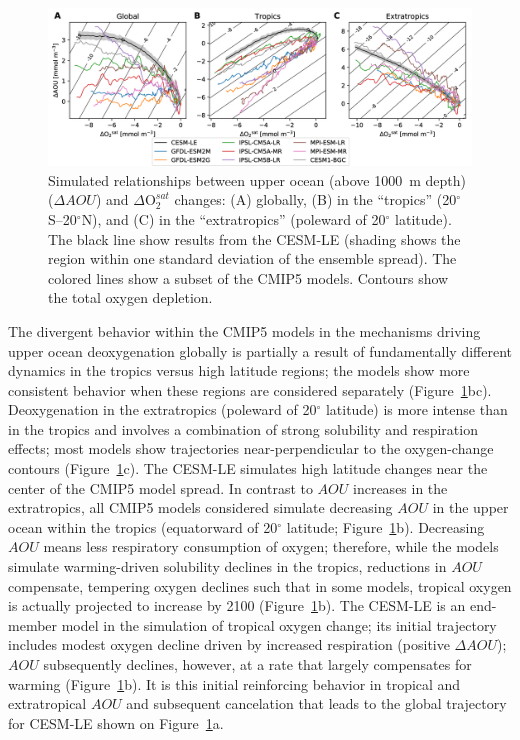 \documentclass{report_chapter}
\begin{document}
\begin{figure}[tbp]
\centering
\includegraphics[width=1\textwidth]{aou-o2sat-phase-diag.png}
\caption{Simulated relationships between upper ocean (above 1000~m depth) ($\Delta AOU$) and $\Delta\mathrm{O}_2^{sat}$ changes: (A) globally, (B) in the ``tropics'' (20$^\circ$S--20$^\circ$N), and (C) in the ``extratropics'' (poleward of 20$^\circ$ latitude).
The black line show results from the CESM-LE (shading shows the region within one standard deviation of the ensemble spread).
The colored lines show a subset of the CMIP5 models.
Contours show the total oxygen depletion.
}
\label{fig:aou-o2sat-phase}
\end{figure}

The divergent behavior within the CMIP5 models in the mechanisms driving upper ocean deoxygenation globally is partially a result of fundamentally different dynamics in the tropics versus high latitude regions; the models show more consistent behavior when these regions are considered separately (Figure~\ref{fig:aou-o2sat-phase}bc).
Deoxygenation in the extratropics (poleward of 20$^\circ$ latitude) is more intense than in the tropics and involves a combination of strong solubility and respiration effects; most models show trajectories near-perpendicular to the oxygen-change contours (Figure~\ref{fig:aou-o2sat-phase}c).
The CESM-LE simulates high latitude changes near the center of the CMIP5 model spread.
In contrast to $AOU$ increases in the extratropics, all CMIP5 models considered simulate decreasing $AOU$ in the upper ocean within the tropics (equatorward of 20$^\circ$ latitude; Figure~\ref{fig:aou-o2sat-phase}b).
Decreasing $AOU$ means less respiratory consumption of oxygen; therefore, while the models simulate warming-driven solubility declines in the tropics, reductions in $AOU$ compensate, tempering oxygen declines such that in some models, tropical oxygen is actually projected to increase by 2100 (Figure~\ref{fig:aou-o2sat-phase}b).
The CESM-LE is an end-member model in the simulation of tropical oxygen change; its initial trajectory includes modest oxygen decline driven by increased respiration (positive $\Delta AOU$); $AOU$ subsequently declines, however, at a rate that largely compensates for warming (Figure~\ref{fig:aou-o2sat-phase}b).
It is this initial reinforcing behavior in tropical and extratropical $AOU$ and subsequent cancelation that leads to the global trajectory for CESM-LE shown on Figure~\ref{fig:aou-o2sat-phase}a.
\end{document}
